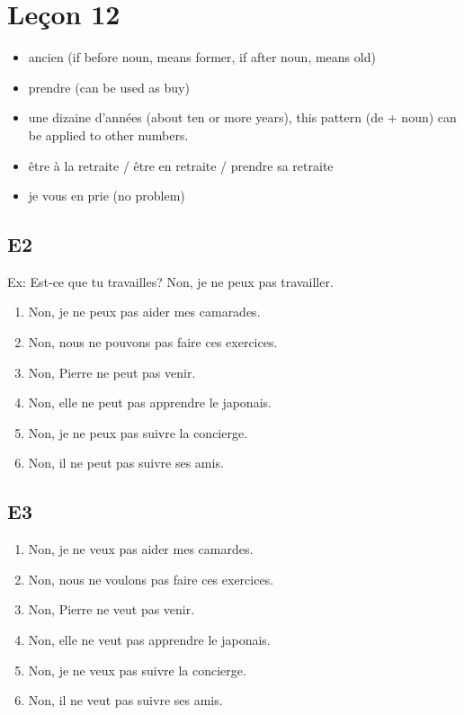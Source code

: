 \documentclass{book}
\begin{document}
\chapter{Leçon 12}
    \begin{itemize}
        \item ancien (if before noun, means former, if after noun, means old)
        \item prendre (can be used as buy)
        \item une dizaine d'années (about ten or more years), this pattern (de + noun) can be applied to other numbers.
        \item être à la retraite / être en retraite / prendre sa retraite
        \item je vous en prie (no problem)
    \end{itemize}

    \section{E2}
        Ex: Est-ce que tu travailles? Non, je ne peux pas travailler.
        \begin{enumerate}
            \item Non, je ne peux pas aider mes camarades.
            \item Non, nous ne pouvons pas faire ces exercices.
            \item Non, Pierre ne peut pas venir.
            \item Non, elle ne peut pas apprendre le japonais.
            \item Non, je ne peux pas suivre la concierge.
            \item Non, il ne peut pas suivre ses amis.
        \end{enumerate}
    
    \section{E3}
        \begin{enumerate}
            \item Non, je ne veux pas aider mes camardes.
            \item Non, nous ne voulons pas faire ces exercices.
            \item Non, Pierre ne veut pas venir.
            \item Non, elle ne veut pas apprendre le japonais.
            \item Non, je ne veux pas suivre la concierge.
            \item Non, il ne veut pas suivre ses amis.
        \end{enumerate}
\end{document}

